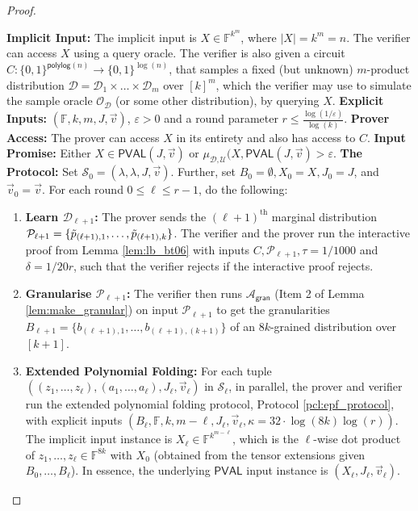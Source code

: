 \documentclass[11pt]{article}
\makeatletter
\newcommand{\polylog}{\mathsf{polylog}}
\newcommand{\PVAL}{\mathsf{PVAL}}
\newcommand{\IPP}{\mathsf{IPP}}
\newcommand{\gran}{\mathsf{gran}}
\newcommand{\F}{\mathbb{F}}
\newcommand{\sU}{\mathcal{U}}
\newcommand{\sD}{\mathcal{D}}
\newcommand{\sO}{\mathcal{O}}
\newcommand{\sA}{\mathcal{A}}
\newcommand{\sP}{\mathcal{P}}
\newenvironment{protocol}[1][htb]{
    \renewcommand{\ALG@name}{Protocol}
    \begin{algorithm}[#1]
    }{\end{algorithm}
}
\makeatother
\begin{document}
\begin{proof}
\begin{protocol}[htp]
\caption{White-box $\IPP$ for $\PVAL$ over $m$-product distributions}
\label{pcl:dfipp_whitebox_pval}
\begin{algorithmic}{}
\vspace{0.1in}
\STATE \textbf{Implicit Input:} The implicit input is $X \in \F^{k^m}$, where $\vert X \vert = k^m = n$. The verifier can access $X$ using a query oracle. The verifier is also given a circuit $C: \{0,1\}^{\polylog(n)} \rightarrow \{0,1\}^{\log (n)}$, that samples a fixed (but unknown) $m$-product distribution $\sD = \sD_1 \times \dots \times \sD_m$ over $[k]^m$, which the verifier may use to simulate the sample oracle $\sO_\sD$ (or some other distribution), by querying $X$.
\vspace{0.1in}
\STATE \textbf{Explicit Inputs:} $(\F, k, m, J, \Vec{v})$, $\varepsilon > 0$ and a round parameter $r \leq \frac{\log(1/\varepsilon)}{\log (k)}$.
\vspace{0.1in}
\STATE \textbf{Prover Access:} The prover can access $X$ in its entirety and also has access to $C$.
\vspace{0.1in}
\STATE \textbf{Input Promise:} Either $X \in \PVAL(J,\Vec{v})$ or $\mu_{\sD,\sU} (X,\PVAL(J,\Vec{v}) > \varepsilon$.
\vspace{0.1in}
\STATE \textbf{The Protocol:}
\STATE Set $\mathcal{S}_0 = (\lambda, \lambda, J, \Vec{v})$. Further, set $B_0 = \emptyset, X_0 = X, J_0 = J$, and $\Vec{v}_0 = \Vec{v}$. 
\STATE For each round $0 \leq \ell \leq r-1$, do the following:
\begin{enumerate}
    \item \textbf{Learn $\sD_{\ell+1}$:} The prover sends the $(\ell+1)^{\text{th}}$ marginal distribution $\sP_{\ell+1} = \{\Tilde{p}_{(\ell+1),1}, \dots, \Tilde{p}_{(\ell+1),k}\}$. The verifier and the prover run the interactive proof from Lemma \ref{lem:lb_bt06} with inputs $C, \sP_{\ell+1}, \tau = 1/1000$ and $\delta = 1/20r$, such that the verifier rejects if the interactive proof rejects.
        
    \item \textbf{Granularise $\sP_{\ell+1}$:} The verifier then runs $\sA_\gran$ (Item 2 of Lemma \ref{lem:make_granular}) on input $\sP_{\ell+1}$ to get the granularities $B_{\ell+1} = \{b_{(\ell+1),1}, \dots, b_{(\ell+1),(k+1)}\}$ of an $8k$-grained distribution over $[k+1]$.
        
    \item \textbf{Extended Polynomial Folding:} For each tuple $((z_1, \dots, z_\ell),(a_1, \dots, a_\ell), J_\ell, \Vec{v}_\ell)$ in $\mathcal{S}_\ell$, in parallel, the prover and verifier run the extended polynomial folding protocol, Protocol \ref{pcl:epf_protocol}, with explicit inputs $(B_\ell, \F, k,m-\ell,J_\ell, \Vec{v}_\ell, \kappa=32\cdot\log (8k)\log (r))$. The implicit input instance is $X_\ell \in \F^{k^{m-\ell}}$, which is the $\ell$-wise dot product of $z_1, \dots, z_\ell \in \F^{8k}$ with $X_0$ (obtained from the tensor extensions given $B_0, \dots, B_\ell$). In essence, the underlying $\PVAL$ input instance is $(X_\ell, J_\ell, \Vec{v}_\ell)$.


\end{enumerate}
\end{algorithmic}
\end{protocol}
\end{proof}
\end{document}
